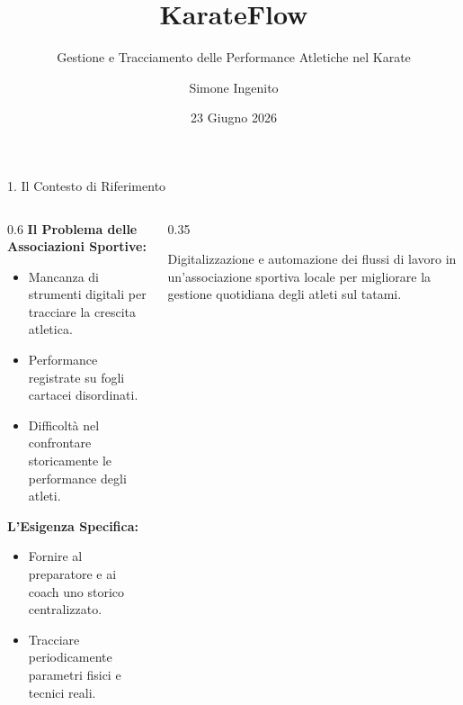\documentclass[aspectratio=169, 10pt]{beamer}
\title[KarateFlow]{KarateFlow}
\subtitle{Gestione e Tracciamento delle Performance Atletiche nel Karate}
\author[Simone Ingenito]{Simone Ingenito}
\institute[SPME]{Corso di Software Project Management and Evolution}
\date[Giugno 2026]{23 Giugno 2026}
\begin{document}
\begin{frame}[plain]
  \titlepage
\end{frame}

\begin{frame}{1. Il Contesto di Riferimento}
  \begin{columns}
    \begin{column}{0.6\textwidth}
      \textbf{Il Problema delle Associazioni Sportive:}
      \begin{itemize}
        \item Mancanza di strumenti digitali per tracciare la crescita atletica.
        \item Performance registrate su fogli cartacei disordinati.
        \item Difficoltà nel confrontare storicamente le performance degli atleti.
      \end{itemize}
      \vspace{0.3cm}
      \textbf{L'Esigenza Specifica:}
      \begin{itemize}
        \item Fornire al preparatore e ai coach uno storico centralizzato.
        \item Tracciare periodicamente parametri fisici e tecnici reali.
      \end{itemize}
    \end{column}
    \begin{column}{0.35\textwidth}
      \begin{tcolorbox}[colback=karateRed!10, colframe=karateRed, title=Inquadramento]
        Digitalizzazione e automazione dei flussi di lavoro in un'associazione sportiva locale per migliorare la gestione quotidiana degli atleti sul tatami.
      \end{tcolorbox}
    \end{column}
  \end{columns}
\end{frame}
\end{document}

